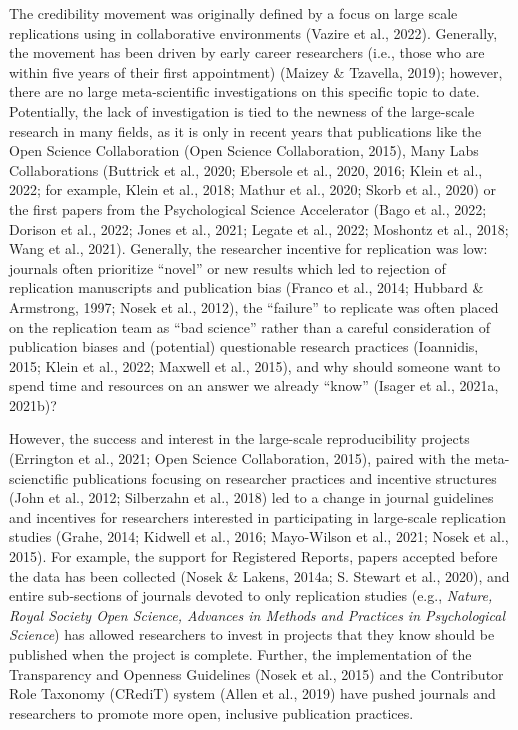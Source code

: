\documentclass[
  man]{apa7}
\begin{document}
The credibility movement was originally defined by a focus on large
scale replications using in collaborative environments (Vazire et al., 2022).
Generally, the movement has been driven by early career researchers
(i.e., those who are within five years of their first appointment)
(Maizey \& Tzavella, 2019); however, there are no large meta-scientific
investigations on this specific topic to date. Potentially, the lack of
investigation is tied to the newness of the large-scale research in many
fields, as it is only in recent years that publications like the Open
Science Collaboration (Open Science Collaboration, 2015), Many Labs
Collaborations (Buttrick et al., 2020; Ebersole et al., 2020, 2016; Klein et al., 2022; for example, Klein et al., 2018; Mathur et al., 2020; Skorb et al., 2020) or the first papers
from the Psychological Science Accelerator (Bago et al., 2022; Dorison et al., 2022; Jones et al., 2021; Legate et al., 2022; Moshontz et al., 2018; Wang et al., 2021). Generally, the
researcher incentive for replication was low: journals often prioritize
``novel'' or new results which led to rejection of replication manuscripts
and publication bias (Franco et al., 2014; Hubbard \& Armstrong, 1997; Nosek et al., 2012), the
``failure'' to replicate was often placed on the replication team as ``bad
science'' rather than a careful consideration of publication biases and
(potential) questionable research practices (Ioannidis, 2015; Klein et al., 2022; Maxwell et al., 2015), and why should someone want to spend time and
resources on an answer we already ``know'' (Isager et al., 2021a, 2021b)?

However, the success and interest in the large-scale reproducibility
projects (Errington et al., 2021; Open Science Collaboration, 2015), paired
with the meta-scienctific publications focusing on researcher practices
and incentive structures (John et al., 2012; Silberzahn et al., 2018) led to a
change in journal guidelines and incentives for researchers interested
in participating in large-scale replication studies (Grahe, 2014; Kidwell et al., 2016; Mayo-Wilson et al., 2021; Nosek et al., 2015). For example, the support
for Registered Reports, papers accepted before the data has been
collected (Nosek \& Lakens, 2014a; S. Stewart et al., 2020), and entire sub-sections of
journals devoted to only replication studies (e.g., \emph{Nature, Royal
Society Open Science, Advances in Methods and Practices in Psychological
Science}) has allowed researchers to invest in projects that they know
should be published when the project is complete. Further, the
implementation of the Transparency and Openness Guidelines (Nosek et al., 2015)
and the Contributor Role Taxonomy (CRediT) system (Allen et al., 2019) have
pushed journals and researchers to promote more open, inclusive
publication practices.
\end{document}
